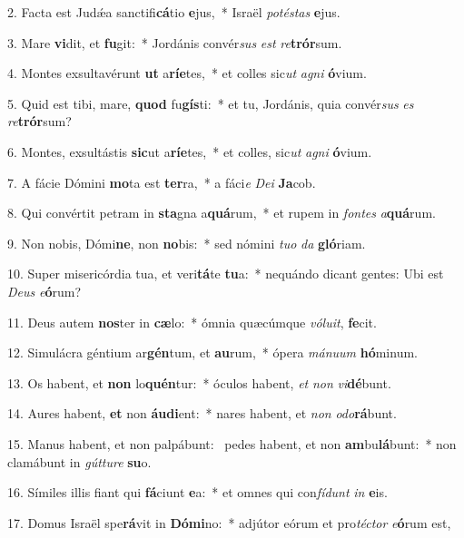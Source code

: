 2. Facta est Judǽa sanctifi\textbf{cá}tio \textbf{e}jus,~*  Israël \textit{pot}\textit{és}\textit{tas} \textbf{e}jus.\

3. Mare \textbf{vi}dit, et \textbf{fu}git:~*  Jordánis convér\textit{sus} \textit{est} \textit{re}\textbf{trór}sum.\

4. Montes exsultavérunt \textbf{ut} a\textbf{rí}\textbf{e}tes,~*  et colles sic\textit{ut} \textit{a}\textit{gni} \textbf{ó}vium.\

5. Quid est tibi, mare, \textbf{quod} fu\textbf{gís}ti:~*  et tu, Jordánis, quia convér\textit{sus} \textit{es} \textit{re}\textbf{trór}sum?\

6. Montes, exsultástis \textbf{sic}ut a\textbf{rí}\textbf{e}tes,~*  et colles, sic\textit{ut} \textit{a}\textit{gni} \textbf{ó}vium.\

7. A fácie Dómini \textbf{mo}ta est \textbf{ter}ra,~*  a fáci\textit{e} \textit{De}\textit{i} \textbf{Ja}cob.\

8. Qui convértit petram in \textbf{sta}gna a\textbf{quá}rum,~*  et rupem in \textit{fon}\textit{tes} \textit{a}\textbf{quá}rum.\

9. Non nobis, Dómi\textbf{ne}, non \textbf{no}bis:~*  sed nómini \textit{tu}\textit{o} \textit{da} \textbf{gló}riam.\

10. Super misericórdia tua, et veri\textbf{tá}te \textbf{tu}a:~*  nequándo dicant gentes: Ubi est \textit{De}\textit{us} \textit{e}\textbf{ó}rum?\

11. Deus autem \textbf{nos}ter in \textbf{cæ}lo:~*  ómnia quæcúmque \textit{vó}\textit{lu}\textit{it}, \textbf{fe}cit.\

12. Simulácra géntium ar\textbf{gén}tum, et \textbf{au}rum,~*  ópera \textit{má}\textit{nu}\textit{um} \textbf{hó}minum.\

13. Os habent, et \textbf{non} lo\textbf{quén}tur:~*  óculos habent, \textit{et} \textit{non} \textit{vi}\textbf{dé}bunt.\

14. Aures habent, \textbf{et} non \textbf{áu}\textbf{di}ent:~*  nares habent, et \textit{non} \textit{o}\textit{do}\textbf{rá}bunt.\

15. Manus habent, et non palpábunt: \dag\  pedes habent, et non \textbf{am}bu\textbf{lá}bunt:~*  non clamábunt in \textit{gút}\textit{tu}\textit{re} \textbf{su}o.\

16. Símiles illis fiant qui \textbf{fá}ciunt \textbf{e}a:~*  et omnes qui con\textit{fí}\textit{dunt} \textit{in} \textbf{e}is.\

17. Domus Israël spe\textbf{rá}vit in \textbf{Dó}\textbf{mi}no:~*  adjútor eórum et pro\textit{téc}\textit{tor} \textit{e}\textbf{ó}rum est,\

